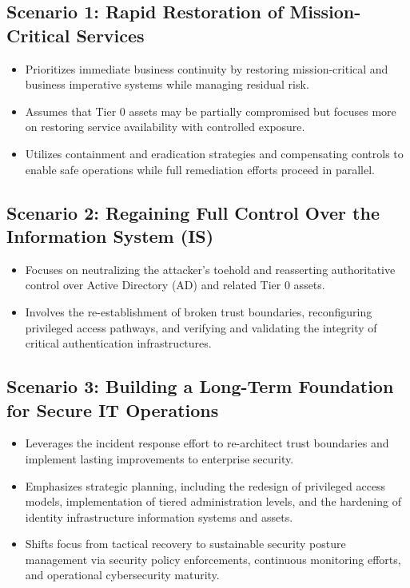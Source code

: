 \subsection{Scenario 1: Rapid Restoration of Mission-Critical Services}
\begin{itemize}
    \item Prioritizes immediate business continuity by restoring mission-critical and business imperative systems while managing residual risk.
    \item Assumes that Tier 0 assets may be partially compromised but focuses more on restoring service availability with controlled exposure.
    \item Utilizes containment and eradication strategies and compensating controls to enable safe operations while full remediation efforts proceed in parallel.
\end{itemize}

\subsection{Scenario 2: Regaining Full Control Over the Information System (IS)}
\begin{itemize}
    \item Focuses on neutralizing the attacker's toehold and reasserting authoritative control over Active Directory (AD) and related Tier 0 assets.
    \item Involves the re-establishment of broken trust boundaries, reconfiguring privileged access pathways, and verifying and validating the integrity of critical authentication infrastructures.
\end{itemize}

\subsection{Scenario 3: Building a Long-Term Foundation for Secure IT Operations}
\begin{itemize}
    \item Leverages the incident response effort to re-architect trust boundaries and implement lasting improvements to enterprise security.
    \item Emphasizes strategic planning, including the redesign of privileged access models, implementation of tiered administration levels, and the hardening of identity infrastructure information systems and assets.
    \item Shifts focus from tactical recovery to sustainable security posture management via security policy enforcements, continuous monitoring efforts, and operational cybersecurity maturity.
\end{itemize}

